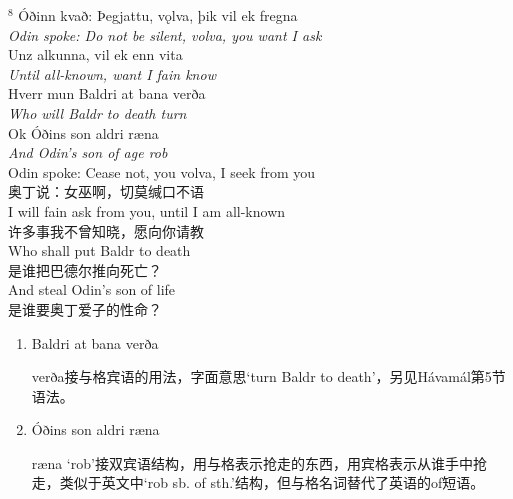 \begin{paracol}{2}
  \noindent
  $^8$ Óðinn kvað: Þegjattu, vǫlva, þik vil ek fregna\\
  \textit{Odin spoke: Do not be silent, volva, you want I ask}\\
  Unz alkunna, vil ek enn vita\\
  \textit{Until all-known, want I fain know}\\
  Hverr mun Baldri at bana verða\\
  \textit{Who will Baldr to death turn}\\
  Ok Óðins son aldri ræna\\
  \textit{And Odin's son of age rob}\\
  \switchcolumn
  \noindent
  Odin spoke: Cease not, you volva, I seek from you\\
  奥丁说：女巫啊，切莫缄口不语\\
  I will fain ask from you, until I am all-known\\
  许多事我不曾知晓，愿向你请教\\
  Who shall put Baldr to death\\
  是谁把巴德尔推向死亡？\\
  And steal Odin's son of life\\
  是谁要奥丁爱子的性命？\\
\end{paracol}
\begin{grammar*}{}
  \begin{enumerate}[leftmargin=*]
    \item Baldri at bana verða

          verða接与格宾语的用法，字面意思`turn Baldr to death'，另见Hávamál第5节语法。

    \item Óðins son aldri ræna

          ræna `rob'接双宾语结构，用与格表示抢走的东西，用宾格表示从谁手中抢走，类似于英文中`rob sb. of sth.'结构，但与格名词替代了英语的of短语。
  \end{enumerate}
\end{grammar*}

